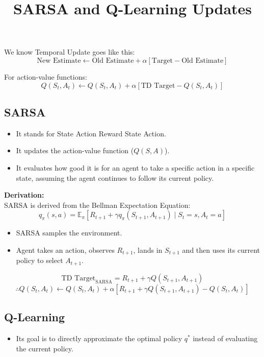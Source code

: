 \documentclass[12pt]{article}
\title{\textbf{SARSA and Q-Learning Updates}}
\author{}
\date{}
\begin{document}
\maketitle

We know Temporal Update goes like this:
$$ \text{New Estimate} \leftarrow \text{Old Estimate} + \alpha [\text{Target} - \text{Old Estimate}] $$

\noindent For action-value functions:
$$ Q(S_t, A_t) \leftarrow Q(S_t, A_t) + \alpha [\text{TD Target} - Q(S_t, A_t)] $$

\subsection*{SARSA}
\begin{itemize}[label=$\bullet$]
    \item It stands for State Action Reward State Action.
    \item It updates the action-value function ($Q(S,A)$).
    \item It evaluates how good it is for an agent to take a specific action in a specific state, assuming the agent continues to follow its current policy.
\end{itemize}

\noindent\textbf{Derivation:} \\
SARSA is derived from the Bellman Expectation Equation:
$$ q_\pi(s,a) = \mathbb{E}_\pi \left[ R_{t+1} + \gamma q_\pi(S_{t+1}, A_{t+1}) \mid S_t=s, A_t=a \right] $$

\begin{itemize}[label=$\bullet$]
    \item SARSA samples the environment.
    \item Agent takes an action, observes $R_{t+1}$, lands in $S_{t+1}$ and then uses its current policy to select $A_{t+1}$.
\end{itemize}

$$ \text{TD Target}_{\text{SARSA}} = R_{t+1} + \gamma Q(S_{t+1}, A_{t+1}) $$
$$ \therefore Q(S_t, A_t) \leftarrow Q(S_t, A_t) + \alpha \left[ R_{t+1} + \gamma Q(S_{t+1}, A_{t+1}) - Q(S_t, A_t) \right] $$

\vspace{0.5cm}

\subsection*{Q-Learning}
\begin{itemize}[label=$\bullet$]
    \item Its goal is to directly approximate the optimal policy $q^*$ instead of evaluating the current policy.
\end{itemize}
\end{document}
